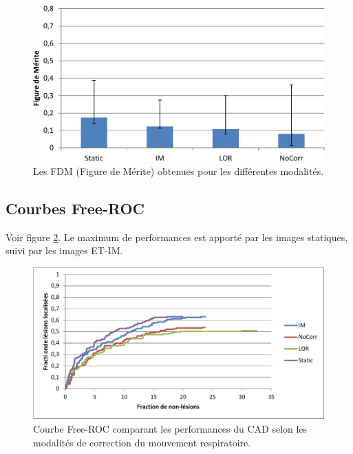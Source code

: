\begin{figure}[h!]
 \begin{center}
   \includegraphics[width=15cm]{images/FOM_mod}
 \end{center}
 \caption{ \label{lab:fom_mod19} Les FDM (Figure de Mérite) obtenues pour les différentes modalités.}
\end{figure}

\subsection{Courbes Free-ROC}

Voir figure \ref{lab:froc_mod}.
Le maximum de performances est apporté par les images statiques, suivi par les images ET-IM.

\begin{figure}[h!]
 \begin{center}
   \includegraphics[width=15cm]{images/FROC_mod}
 \end{center}
 \caption{ \label{lab:froc_mod} Courbe Free-ROC comparant les performances du CAD selon les modalités de correction du mouvement respiratoire.}
\end{figure}


